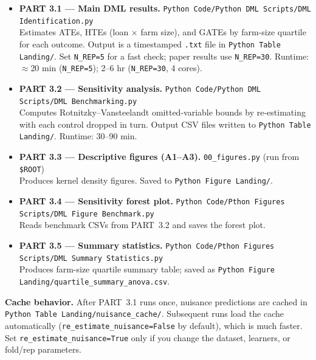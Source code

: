 \documentclass[11pt]{article}
\begin{document}
\begin{itemize}
    \item \textbf{PART 3.1 --- Main DML results.}
          \texttt{Python Code/Python DML Scripts/DML Identification.py} \\
          Estimates ATEs, HTEs (loan $\times$ farm size), and GATEs by
          farm-size quartile for each outcome. Output is a timestamped
          \texttt{.txt} file in \texttt{Python Table Landing/}.
          Set \texttt{N\_REP=5} for a fast check; paper results use
          \texttt{N\_REP=30}. Runtime: $\approx$20 min (\texttt{N\_REP=5});
          2--6 hr (\texttt{N\_REP=30}, 4 cores).

    \item \textbf{PART 3.2 --- Sensitivity analysis.}
          \texttt{Python Code/Python DML Scripts/DML Benchmarking.py} \\
          Computes Rotnitzky--Vansteelandt omitted-variable bounds by
          re-estimating with each control dropped in turn.
          Output CSV files written to \texttt{Python Table Landing/}.
          Runtime: 30--90 min.

    \item \textbf{PART 3.3 --- Descriptive figures (A1--A3).}
          \texttt{00\_figures.py} (run from \texttt{\$ROOT}) \\
          Produces kernel density figures. Saved to
          \texttt{Python Figure Landing/}.

    \item \textbf{PART 3.4 --- Sensitivity forest plot.}
          \texttt{Python Code/Pthon Figures Scripts/DML Figure Benchmark.py} \\
          Reads benchmark CSVs from PART~3.2 and saves the forest plot.

    \item \textbf{PART 3.5 --- Summary statistics.}
          \texttt{Python Code/Pthon Figures Scripts/DML Summary Statistics.py} \\
          Produces farm-size quartile summary table; saved as
          \texttt{Python Figure Landing/quartile\_summary\_anova.csv}.
\end{itemize}

\begin{notebox}
\textbf{Cache behavior.} After PART~3.1 runs once, nuisance predictions are
cached in \texttt{Python Table Landing/nuisance\_cache/}. Subsequent runs
load the cache automatically (\texttt{re\_estimate\_nuisance=False} by
default), which is much faster. Set \texttt{re\_estimate\_nuisance=True}
only if you change the dataset, learners, or fold/rep parameters.
\end{notebox}
\end{document}
